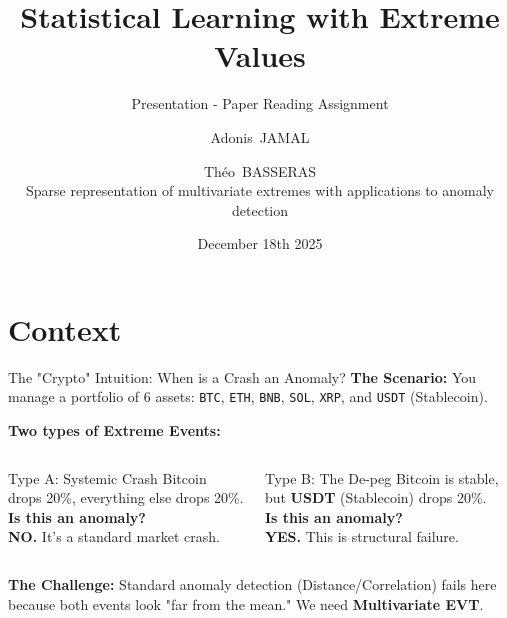 \documentclass{beamer}
\title[Extreme Values]{Statistical Learning with Extreme Values}
\subtitle{Presentation - Paper Reading Assignment}
\author[Jamal, Basseras]{Adonis~JAMAL \and Théo~BASSERAS\\Sparse representation of multivariate extremes with
applications to anomaly detection}
\institute[ENS Paris-Saclay]{Ecole Normale Supérieure Paris-Saclay - MVA}
\date[December 18th 2025]{December 18th 2025}
\begin{document}
\frame{\titlepage}

\section{Context}
\begin{frame}{The "Crypto" Intuition: When is a Crash an Anomaly?}
    \textbf{The Scenario:}
    You manage a portfolio of 6 assets:
    \texttt{BTC}, \texttt{ETH}, \texttt{BNB}, \texttt{SOL}, \texttt{XRP}, and \texttt{USDT} (Stablecoin).
    
    \vspace{0.3cm}
    \textbf{Two types of Extreme Events:}
    \begin{columns}
        \begin{block}{Type A: Systemic Crash}
            \centering
            Bitcoin drops 20\%, everything else drops 20\%. \\
            \vspace{0.2cm}
            \textbf{Is this an anomaly?} \\
            \textcolor{CSred}{\textbf{NO.}} It's a standard market crash.
        \end{block}

        \begin{block}{Type B: The De-peg}
            \centering
            Bitcoin is stable, but \textbf{USDT} (Stablecoin) drops 20\%. \\
            \vspace{0.2cm}
            \textbf{Is this an anomaly?} \\
            \textcolor{green!50!black}{\textbf{YES.}} This is structural failure.
        \end{block}
    \end{columns}

    \vspace{0.3cm}
    \textbf{The Challenge:} Standard anomaly detection (Distance/Correlation) fails here because both events look "far from the mean." We need \textbf{Multivariate EVT}.
\end{frame}

\end{document}
